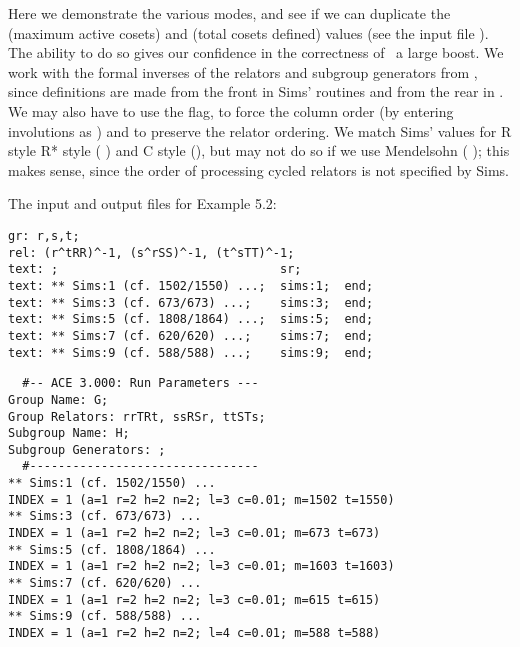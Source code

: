 


Here we demonstrate the various  modes, and see if we can
  duplicate the  (maximum active cosets) and  (total cosets
  defined) values (see the input file ).
The ability to do so gives our confidence in the correctness of \ace\ a
  large boost.
We work with the formal inverses of the relators and subgroup generators
  from \cite{Sim}, since definitions are made from the front in Sims'
  routines and from the rear in \ace.
We may also have to use the  flag, to force the column order (by
  entering involutions as ) and to preserve the relator ordering.
We match Sims' values for R style \amp R* style ( \amp 
  ) and C style (), but may not do so if we use
  Mendelsohn ( \amp {}); this makes sense, since the
  order of processing cycled relators is not specified by Sims.

The input and output files for Example 5.2:

\bv\begin{verbatim}
gr: r,s,t;
rel: (r^tRR)^-1, (s^rSS)^-1, (t^sTT)^-1;
text: ;                               sr;
text: ** Sims:1 (cf. 1502/1550) ...;  sims:1;  end;
text: ** Sims:3 (cf. 673/673) ...;    sims:3;  end;
text: ** Sims:5 (cf. 1808/1864) ...;  sims:5;  end;
text: ** Sims:7 (cf. 620/620) ...;    sims:7;  end;
text: ** Sims:9 (cf. 588/588) ...;    sims:9;  end;
\end{verbatim}\ev

\bv\begin{verbatim}
  #-- ACE 3.000: Run Parameters ---
Group Name: G;
Group Relators: rrTRt, ssRSr, ttSTs;
Subgroup Name: H;
Subgroup Generators: ;
  #--------------------------------
** Sims:1 (cf. 1502/1550) ...
INDEX = 1 (a=1 r=2 h=2 n=2; l=3 c=0.01; m=1502 t=1550)
** Sims:3 (cf. 673/673) ...
INDEX = 1 (a=1 r=2 h=2 n=2; l=3 c=0.01; m=673 t=673)
** Sims:5 (cf. 1808/1864) ...
INDEX = 1 (a=1 r=2 h=2 n=2; l=3 c=0.01; m=1603 t=1603)
** Sims:7 (cf. 620/620) ...
INDEX = 1 (a=1 r=2 h=2 n=2; l=3 c=0.01; m=615 t=615)
** Sims:9 (cf. 588/588) ...
INDEX = 1 (a=1 r=2 h=2 n=2; l=4 c=0.01; m=588 t=588)
\end{verbatim}\ev

